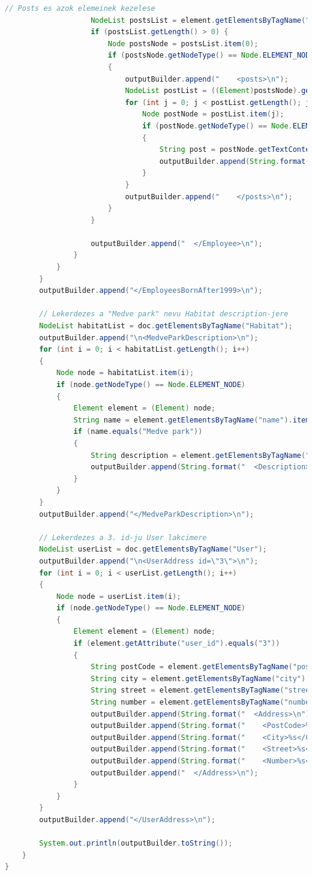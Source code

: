 \documentclass[12pt]{report}
\begin{document}
\begin{lstlisting}[caption={DOMQueryKLNSPG.java} adatlekérdező program, language=Java]
					// Posts es azok elemeinek kezelese
					NodeList postsList = element.getElementsByTagName("posts");
					if (postsList.getLength() > 0) {
						Node postsNode = postsList.item(0);
						if (postsNode.getNodeType() == Node.ELEMENT_NODE) 
						{
							outputBuilder.append("    <posts>\n");
							NodeList postList = ((Element)postsNode).getElementsByTagName("post");
							for (int j = 0; j < postList.getLength(); j++) {
								Node postNode = postList.item(j);
								if (postNode.getNodeType() == Node.ELEMENT_NODE) 
								{
									String post = postNode.getTextContent();
									outputBuilder.append(String.format("      <post>%s</post>\n", post));
								}
							}
							outputBuilder.append("    </posts>\n");
						}
					}
					
					outputBuilder.append("  </Employee>\n");
				}
			}
		}
		outputBuilder.append("</EmployeesBornAfter1999>\n");
		
		// Lekerdezes a "Medve park" nevu Habitat description-jere
		NodeList habitatList = doc.getElementsByTagName("Habitat");
		outputBuilder.append("\n<MedveParkDescription>\n");
		for (int i = 0; i < habitatList.getLength(); i++) 
		{
			Node node = habitatList.item(i);
			if (node.getNodeType() == Node.ELEMENT_NODE) 
			{
				Element element = (Element) node;
				String name = element.getElementsByTagName("name").item(0).getTextContent();
				if (name.equals("Medve park")) 
				{
					String description = element.getElementsByTagName("description").item(0).getTextContent();
					outputBuilder.append(String.format("  <Description>%s</Description>\n", description));
				}
			}
		}
		outputBuilder.append("</MedveParkDescription>\n");
		
		// Lekerdezes a 3. id-ju User lakcimere
		NodeList userList = doc.getElementsByTagName("User");
		outputBuilder.append("\n<UserAddress id=\"3\">\n");
		for (int i = 0; i < userList.getLength(); i++) 
		{
			Node node = userList.item(i);
			if (node.getNodeType() == Node.ELEMENT_NODE) 
			{
				Element element = (Element) node;
				if (element.getAttribute("user_id").equals("3")) 
				{
					String postCode = element.getElementsByTagName("post_code").item(0).getTextContent();
					String city = element.getElementsByTagName("city").item(0).getTextContent();
					String street = element.getElementsByTagName("street").item(0).getTextContent();
					String number = element.getElementsByTagName("number").item(0).getTextContent();
					outputBuilder.append(String.format("  <Address>\n"));
					outputBuilder.append(String.format("    <PostCode>%s</PostCode>\n", postCode));
					outputBuilder.append(String.format("    <City>%s</City>\n", city));
					outputBuilder.append(String.format("    <Street>%s</Street>\n", street));
					outputBuilder.append(String.format("    <Number>%s</Number>\n", number));
					outputBuilder.append("  </Address>\n");
				}
			}
		}
		outputBuilder.append("</UserAddress>\n");
		
		System.out.println(outputBuilder.toString());
	}
}
\end{lstlisting}
\end{document}
